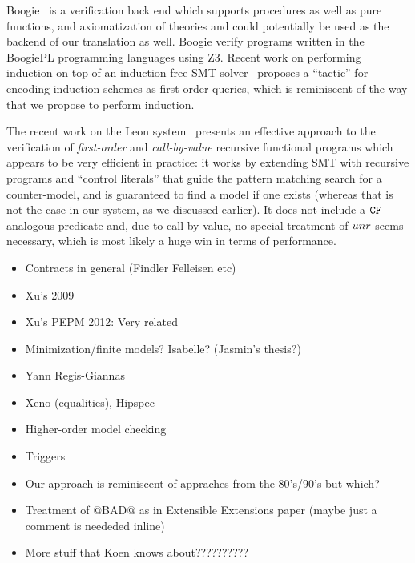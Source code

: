 Boogie~\cite{boogie} is a verification back end which supports procedures as well as 
pure functions, and axiomatization of theories and could potentially be used as the 
backend of our translation as well. Boogie verify programs written in the BoogiePL 
programming languages using Z3. Recent work on performing induction on-top of an 
induction-free SMT solver~\cite{Leino:2012:AIS:2189257.2189278} proposes a ``tactic''
for encoding induction schemes as first-order queries, which is reminiscent of the way
that we propose to perform induction.

The recent work on the Leon system~\cite{Suter:2011:SMR:2041552.2041575} presents
an effective approach to the verification of {\em first-order} and {\em call-by-value} 
recursive functional programs which appears to be very efficient in practice: it works
by extending SMT with recursive programs and ``control literals'' that guide the pattern
matching search for a counter-model, and is guaranteed to find a model if one exists 
(whereas that is not the case in our system, as we discussed earlier). It does not include
a ${\tt CF}$-analogous predicate and, due to call-by-value, no special treatment of $\mathop{unr}$ seems
necessary, which is most likely a huge win in terms of performance.


\begin{itemize}
  \item Contracts in general (Findler Felleisen etc)
  \item Xu's 2009
  \item Xu's PEPM 2012: Very related
  \item Minimization/finite models? Isabelle? (Jasmin's thesis?)
  \item Yann Regis-Giannas 
  \item Xeno (equalities), Hipspec 
  \item Higher-order model checking
  \item Triggers
  \item Our approach is reminiscent of appraches from the 80's/90's but which?
  \item Treatment of @BAD@ as in Extensible Extensions paper (maybe just a comment is neededed inline)
  \item More stuff that Koen knows about??????????
\end{itemize}
